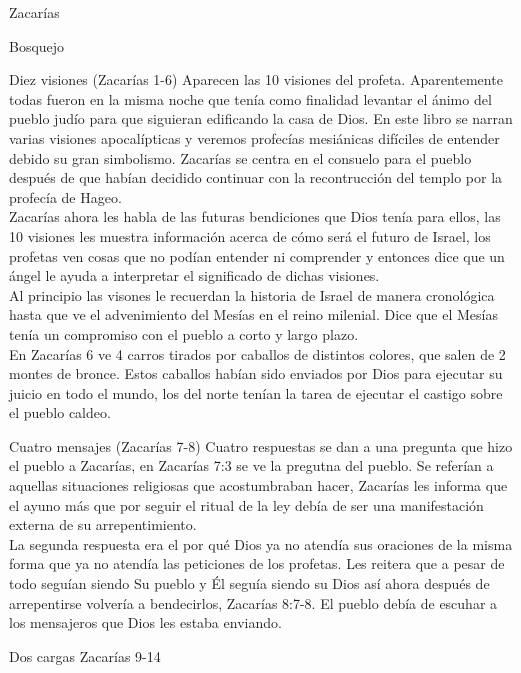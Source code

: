\begin{section}{Zacarías}
\begin{enumerate}
	\end{enumerate}
	\begin{subsection}{Bosquejo}
		\begin{subsubsection}{Diez visiones (Zacarías 1-6)}
			Aparecen las 10 visiones del profeta. Aparentemente todas fueron en la misma noche que tenía como finalidad levantar el ánimo del pueblo judío para que siguieran edificando la casa de Dios. En este libro se narran varias visiones apocalípticas y veremos profecías mesiánicas difíciles de entender debido su gran simbolismo.
			\newpage
			Zacarías se centra en el consuelo para el pueblo después de que habían decidido continuar con la recontrucción del templo por la profecía de Hageo.\\
			Zacarías ahora les habla de las futuras bendiciones que Dios tenía para ellos, las 10 visiones les muestra información acerca de cómo será el futuro de Israel, los profetas ven cosas que no podían entender ni comprender y entonces dice que un ángel le ayuda a interpretar el significado de dichas visiones.\\
			Al principio las visones le recuerdan la historia de Israel de manera cronológica hasta que ve el advenimiento del Mesías en el reino milenial. Dice que el Mesías tenía un compromiso con el pueblo a corto y largo plazo.\\
			En Zacarías 6 ve 4 carros tirados por caballos de distintos colores, que salen de 2 montes de bronce. Estos caballos habían sido enviados por Dios para ejecutar su juicio en todo el mundo, los del norte tenían la tarea de ejecutar el castigo sobre el pueblo caldeo.
		\end{subsubsection}
		\begin{subsubsection}{Cuatro mensajes (Zacarías 7-8)}
			Cuatro respuestas se dan a una pregunta que hizo el pueblo a Zacarías, en Zacarías 7:3 se ve la pregutna del pueblo. Se referían a aquellas situaciones religiosas que acostumbraban hacer, Zacarías les informa que el ayuno más que por seguir el ritual de la ley debía de ser una manifestación externa de su arrepentimiento.\\
			La segunda respuesta era el por qué Dios ya no atendía sus oraciones de la misma forma que ya no atendía las peticiones de los profetas. Les reitera que a pesar de todo seguían siendo Su pueblo y Él seguía siendo su Dios así ahora después de arrepentirse volvería a bendecirlos, Zacarías 8:7-8. El pueblo debía de escuhar a los mensajeros que Dios les estaba enviando.
		\end{subsubsection}
		\begin{subsubsection}{Dos cargas Zacarías 9-14}

\end{subsubsection}
\end{subsection}
\end{section}
